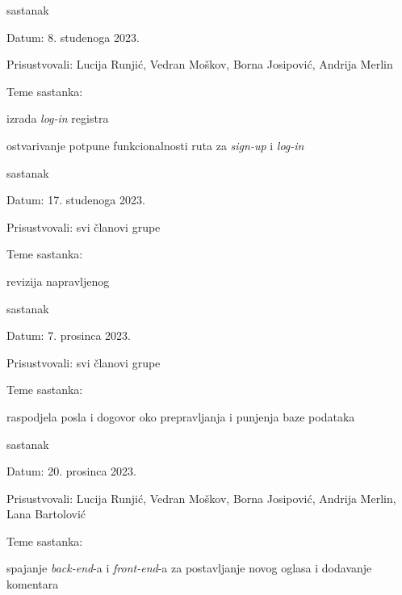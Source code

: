 \begin{packed_enum}
			\item sastanak
			
			\item[] \begin{packed_item}
				\item Datum: 8. studenoga 2023.
				\item Prisustvovali: Lucija Runjić, Vedran Moškov, Borna Josipović, Andrija Merlin
				\item Teme sastanka:
				\begin{packed_item}
					\item izrada \textit{log-in} registra
					\item ostvarivanje potpune funkcionalnosti ruta za \textit{sign-up} i \textit{log-in}
				\end{packed_item}
			\end{packed_item}
			
			\item sastanak
			
			\item[] \begin{packed_item}
				\item Datum: 17. studenoga 2023.
				\item Prisustvovali: svi članovi grupe
				\item Teme sastanka:
				\begin{packed_item}
					\item revizija napravljenog
				\end{packed_item}
			\end{packed_item}
		
			\item sastanak
			
			\item[] \begin{packed_item}
				\item Datum: 7. prosinca 2023.
				\item Prisustvovali: svi članovi grupe
				\item Teme sastanka:
				\begin{packed_item}
					\item raspodjela posla i dogovor oko prepravljanja i punjenja baze podataka
				\end{packed_item}
			\end{packed_item}
			
			\item sastanak
			
			\item[] \begin{packed_item}
				\item Datum: 20. prosinca 2023.
				\item Prisustvovali: Lucija Runjić, Vedran Moškov, Borna Josipović, Andrija Merlin, Lana Bartolović
				\item Teme sastanka:
				\begin{packed_item}
					\item spajanje \textit{back-end}-a i \textit{front-end}-a za postavljanje novog oglasa i dodavanje komentara
				\end{packed_item}
			\end{packed_item}
			

\end{packed_enum}
